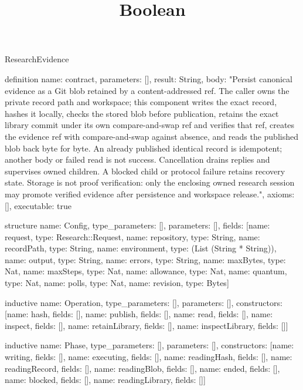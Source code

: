 \begin{lexlean}{ResearchEvidence}
\title{Boolean}
\begin{semanticmodule}

definition{
 name: contract,
 parameters: [],
 result: String,
 body: "Persist canonical evidence as a Git blob retained by a content-addressed ref. The caller owns the private record path and workspace; this component writes the exact record, hashes it locally, checks the stored blob before publication, retains the exact library commit under its own compare-and-swap ref and verifies that ref, creates the evidence ref with compare-and-swap against absence, and reads the published blob back byte for byte. An already published identical record is idempotent; another body or failed read is not success. Cancellation drains replies and supervises owned children. A blocked child or protocol failure retains recovery state. Storage is not proof verification: only the enclosing owned research session may promote verified evidence after persistence and workspace release.",
 axioms: [],
 executable: true
}

structure{
 name: Config,
 type_parameters: [],
 parameters: [],
 fields: [{name: request, type: Research::Request}, {name: repository, type: String}, {name: recordPath, type: String}, {name: environment, type: (List (String * String))}, {name: output, type: String}, {name: errors, type: String}, {name: maxBytes, type: Nat}, {name: maxSteps, type: Nat}, {name: allowance, type: Nat}, {name: quantum, type: Nat}, {name: polls, type: Nat}, {name: revision, type: Bytes}]
}

inductive{
 name: Operation,
 type_parameters: [],
 parameters: [],
 constructors: [{name: hash, fields: []}, {name: publish, fields: []}, {name: read, fields: []}, {name: inspect, fields: []}, {name: retainLibrary, fields: []}, {name: inspectLibrary, fields: []}]
}

inductive{
 name: Phase,
 type_parameters: [],
 parameters: [],
 constructors: [{name: writing, fields: []}, {name: executing, fields: []}, {name: readingHash, fields: []}, {name: readingRecord, fields: []}, {name: readingBlob, fields: []}, {name: ended, fields: []}, {name: blocked, fields: []}, {name: readingLibrary, fields: []}]
}


\end{semanticmodule}
\end{lexlean}
